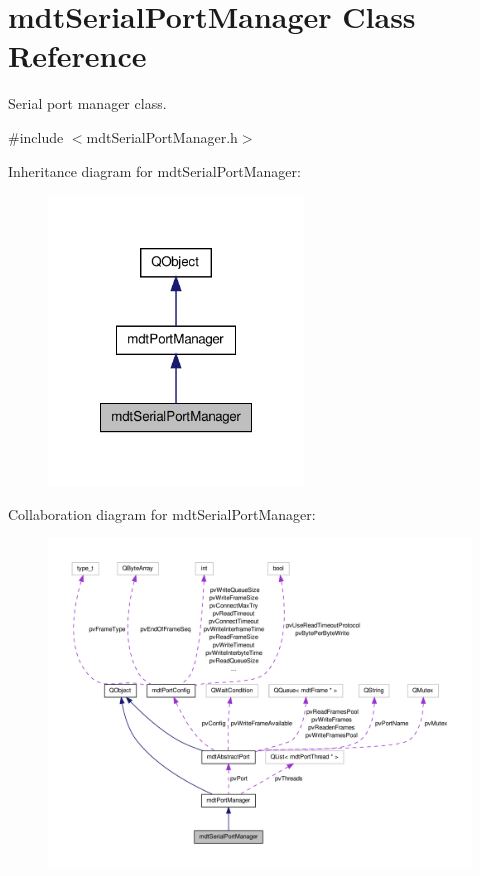 \hypertarget{classmdt_serial_port_manager}{\section{mdt\-Serial\-Port\-Manager Class Reference}
\label{classmdt_serial_port_manager}
}


Serial port manager class.  




{\ttfamily \#include $<$mdt\-Serial\-Port\-Manager.\-h$>$}



Inheritance diagram for mdt\-Serial\-Port\-Manager\-:\nopagebreak
\begin{figure}[H]
\begin{center}
\leavevmode
\includegraphics[width=192pt]{classmdt_serial_port_manager__inherit__graph}
\end{center}
\end{figure}


Collaboration diagram for mdt\-Serial\-Port\-Manager\-:\nopagebreak
\begin{figure}[H]
\begin{center}
\leavevmode
\includegraphics[width=350pt]{classmdt_serial_port_manager__coll__graph}
\end{center}
\end{figure}
